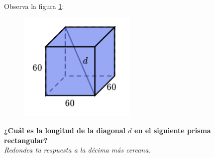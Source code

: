 Observa la figura \ref{fig:pitagoras3D_diag_03}:
\begin{figure}[H]
    \begin{center}
        \includegraphics[width=0.5\textwidth]{../images/pitagoras3D_diag_03.png}
    \end{center}
    \caption{}
    \label{fig:pitagoras3D_diag_03}
\end{figure}
\textbf{¿Cuál es la longitud de la diagonal $d$ en el siguiente prisma rectangular?}\\
\textit{Redondea tu respuesta a la décima más cercana.}